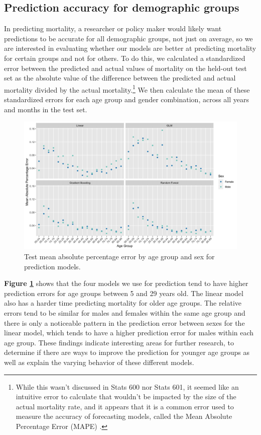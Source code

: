 \documentclass[letterpaper, 11pt]{article}
\begin{document}
\subsection{Prediction accuracy for demographic groups}

In predicting mortality, a researcher or policy maker would likely want predictions to be accurate for all demographic groups, not just on average, so we are interested in evaluating whether our models are better at predicting mortality for certain groups and not for others. To do this, we calculated a standardized error between the predicted and actual values of mortality on the held-out test set as the absolute value of the difference between the predicted and actual mortality divided by the actual mortality.\footnote{While this wasn't discussed in Stats 600 nor Stats 601, it seemed like an intuitive error to calculate that wouldn't be impacted by the size of the actual mortality rate, and it appears that it is a common error used to measure the accuracy of forecasting models, called the Mean Absolute Percentage Error (MAPE) \cite{mape}.} We then calculate the mean of these standardized errors for each age group and gender combination, across all years and months in the test set.

\begin{figure}[ht]
    \centering
    \includegraphics[width = \textwidth]{../figures/err_groups.png}
    \caption{Test mean absolute percentage error by age group and sex for prediction models.}
    \label{fig:mod_err_group}
\end{figure}

\textbf{Figure \ref{fig:mod_err_group}} shows that the four models we use for prediction tend to have higher prediction errors for age groups between 5 and 29 years old. The linear model also has a harder time predicting mortality for older age groups. The relative errors tend to be similar for males and females within the same age group and there is only a noticeable pattern in the prediction error between sexes for the linear model, which tends to have a higher prediction error for males within each age group.  These findings indicate interesting areas for further research, to determine if there are ways to improve the prediction for younger age groups as well as explain the varying behavior of these different models.
\end{document}
